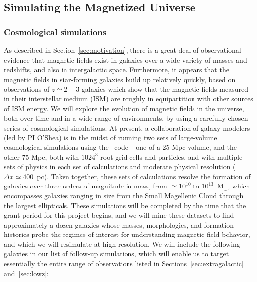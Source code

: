 \subsection{Simulating the Magnetized Universe}
\label{sec:simulations}
\vspace{-1mm}

\subsubsection{Cosmological simulations}
\label{sec:cosmo_sims}
\vspace{-2mm}

As described in Section~\ref{sec:motivation}, there is a great deal of
observational evidence that magnetic fields exist in galaxies over a
wide variety of masses and redshifts, and also in intergalactic space.
Furthermore, it appears that the magnetic fields in star-forming
galaxies build up relatively quickly, based on observations of $z
\simeq 2-3$ galaxies which show that the magnetic fields measured in
their interstellar medium (ISM) are roughly in equipartition with
other sources of ISM energy.  We will explore the evolution of
magnetic fields in the universe, both over time and in a wide range of
environments, by using a carefully-chosen series of cosmological
simulations.  At present, a collaboration of galaxy modelers
(led by PI O'Shea) is in the midst of running two sets of
large-volume cosmological simulations using the \enzo\ code -- one of
a 25 Mpc volume, and the other 75 Mpc, both with $1024^3$ root grid
cells and particles, and with multiple sets of physics in each set of
calculations and moderate physical resolution ($\Delta x \simeq 400$~pc).  Taken together, these sets of calculations resolve the
formation of galaxies over three orders of magnitude in mass, from
$\simeq 10^{10}$ to $10^{13}$~M$_\odot$, which encompasses galaxies
ranging in size from the Small Magellenic Cloud through the largest
ellipticals.  These simulations will be completed by the time that the
grant period for this project begins, and we will mine these datasets
to find approximately a dozen galaxies whose masses, morphologies, and
formation histories probe the regimes of interest for understanding
magnetic field behavior, and which we will resimulate at high resolution.  We will include
the following galaxies in our list of follow-up simulations,
which will enable us to target essentially the entire range of
observations listed in Sections~\ref{sec:extragalactic}
and~\ref{sec:lowz}:


